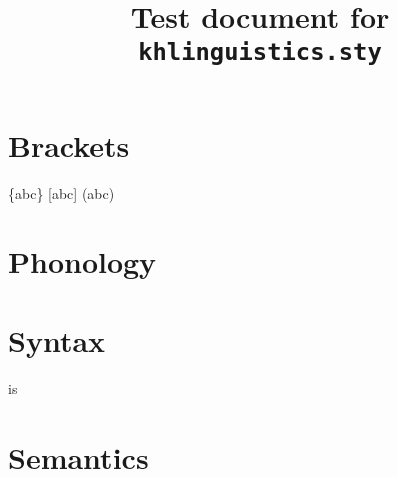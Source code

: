 \documentclass{kharticle}
\title{Test document for \texttt{khlinguistics.sty}}
\begin{document}
\maketitle

\section{Brackets}

\begin{examplebox}
 \{abc\} [abc] (abc)
\end{examplebox}

\begin{examplebox}
\end{examplebox}


\section{Phonology}

\begin{examplebox}
 \par
{}
\end{examplebox}


\section{Syntax}

\begin{examplebox}
\end{examplebox}

\begin{examplebox}
 is 
\end{examplebox}


\section{Semantics}

\begin{examplebox}
 \par
\semet \par
\semeet \par
\semett \par
\semetet
\end{examplebox}

\begin{examplebox}
\end{examplebox}
\end{document}
